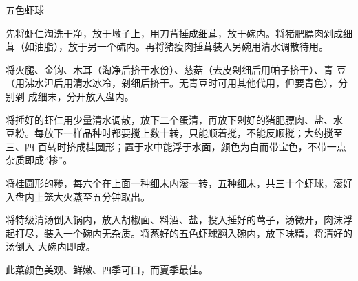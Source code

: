 \begin{recipe}{五色虾球}

\ingredients


\preparation

\step 先将虾仁淘洗干净，放于墩子上，用刀背捶成细茸，放于碗内。将猪肥膘肉剁成细
茸（如油脂），放于另一个硫内。再将猪瘦肉捶茸装入另碗用清水调散待用。

\step 将火腿、金钩、木耳（淘净后挤干水份）、慈菇（去皮剁细后用帕子挤干）、青
豆（用沸水泹后用清水冰冷，剁细后挤干。无青豆时可用其他代用，但要青色），分别剁
成细末，分开放入盘内。

\step 将捶好的虾仁用少量清水调散，放下二个蛋清，再放下剁好的猪肥膘肉、盐、水
豆粉。每放下一样品种时都要搅上数十转，只能顺着搅，不能反顺搅；大约搅至三、四
百转时挤成桂圆形；置于水中能浮于水面，颜色为白而带宝色，不带一点杂质即成“糁”。

\step 将桂圆形的糁，每六个在上面一种细末内滚一转，五种细末，共三十个虾球，滚好
入盘内上笼大火蒸至五分钟取出。

\step 将特级清汤倒入锅内，放入胡椒面、料酒、盐，投入捶好的莺子，汤微开，肉沫浮
起打尽，装入一个碗内无杂质。将蒸好的五色虾球翻入碗内，放下味精，将清好的汤倒入
大碗内即成。

\features

此菜颜色美观、鲜嫩、四季可口，而夏季最佳。

\end{recipe}

